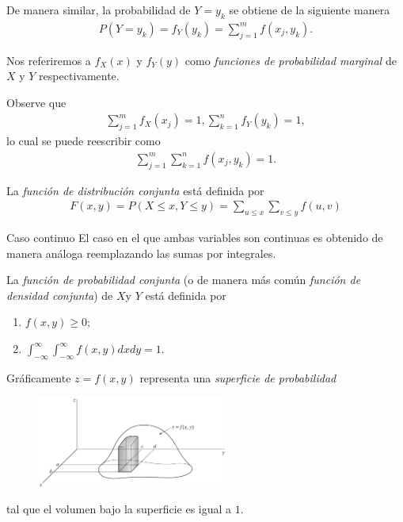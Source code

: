 	De manera similar, la probabilidad de $Y=y_{k}$ se obtiene de la siguiente manera
	\begin{align}
	\label{2.16}
		P(Y=y_{k})=f_{Y}(y_{k})=\sum_{j=1}^{m}f(x_{j},y_{k}).
	\end{align}


 
 	Nos referiremos a $f_{X}(x)$ y $f_{Y}(y)$ como \emph{funciones de probabilidad marginal} de $X$ y $Y$ respectivamente.
 

	Observe que
	\begin{align}
	\label{2.17}
		\sum_{j=1}^{m}f_{X}(x_{j})=1,
		\sum_{k=1}^{n}f_{Y}(y_{k})=1,
	\end{align}
	lo cual se puede reescribir como
	\begin{align}
		\label{2.18}
		\sum_{j=1}^{m}\sum_{k=1}^{n}f(x_{j},y_{k})=1.
	\end{align}



	La \emph{función de distribución conjunta } está definida por
	\begin{align}
	\label{2.19}
		F(x,y)=P(X\leq x, Y\leq y)
		=\sum_{u\leq x}\sum_{v\leq y}f(u,v)
	\end{align}



{Caso continuo}
	El caso en el que ambas variables son continuas es obtenido de manera análoga reemplazando las sumas por integrales.


	La \emph{función de probabilidad conjunta} (o de manera más común \emph{función de densidad conjunta}) de $X$y $Y$ está definida por
	\begin{enumerate}
		\item $f(x,y)\geq 0;$
		\item $\displaystyle \int_{-\infty}^{\infty}\int_{-\infty}^{\infty}
		f(x,y) dxdy=1.$
	\end{enumerate}



	Gráficamente $z=f(x,y)$ representa una \emph{superficie de probabilidad}
\begin{figure}
	\centering
	\includegraphics[height=3cm,keepaspectratio=true]{./pe/pands0204.png}
	\label{fig:2.4}
\end{figure}
tal que el volumen bajo la superficie es igual a $1.$


